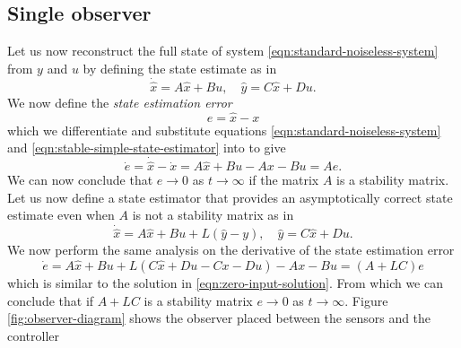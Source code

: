 \subsection{Single observer}
Let us now reconstruct the full state of system \eqref{eqn:standard-noiseless-system} from  $y$ and $u$ by defining the state estimate as in \cite[Section 16.5]{Hespanha2018LinearTheory}
\begin{equation}\label{eqn:stable-simple-state-estimator}
    \dot{\hat{x}} = A\hat{x} + Bu, \quad \hat{y} = C\hat{x} + Du.
\end{equation}
We now define the \textit{state estimation error}
\begin{equation}\label{eqn:estimate-error}
    e = \hat{x} - x
\end{equation}
which we differentiate and substitute equations \eqref{eqn:standard-noiseless-system} and \eqref{eqn:stable-simple-state-estimator} into to give
\begin{equation*}
    \dot{e} = \dot{\hat{x}} - \dot{x} = A\hat{x} + Bu - Ax - Bu = Ae.
\end{equation*}
We can now conclude that $e \rightarrow 0$ as $t \rightarrow \infty$ if the matrix $A$ is a stability matrix. Let us now define a state estimator that provides an asymptotically correct state estimate even when $A$ is not a stability matrix as in \cite[Section 16.5]{Hespanha2018LinearTheory}
\begin{equation}\label{eqn:unstable-simple-state-estimator}
    \dot{\hat{x}} = A\hat{x} + Bu + L(\hat{y} - y), \quad \hat{y} = C\hat{x} + Du.
\end{equation}
We now perform the same analysis on the derivative of the state estimation error
\begin{equation}\label{eqn:error-linear-observer}
    \dot{e} = A\hat{x} + Bu + L(C\hat{x} + Du - Cx - Du) - Ax - Bu = (A+LC)e
\end{equation}
which is similar to the solution in \eqref{eqn:zero-input-solution}. From which we can conclude that if $A+LC$ is a stability matrix $e \rightarrow 0$ as $t \rightarrow \infty$. Figure \ref{fig:observer-diagram} shows the observer placed between the sensors and the controller

